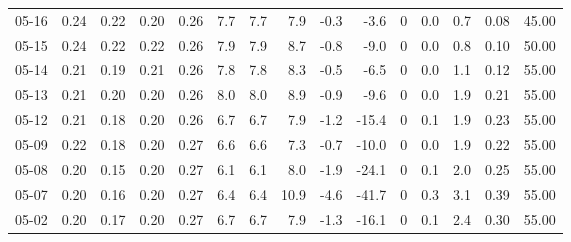 \begin{threeparttable}
{\begin{tabular}{lrrrrrrrrrrrrrr}
  05-16 &          0.24 &          0.22 &          0.20 &        0.26 &                 7.7 &                7.7 &                 7.9 &       -0.3 &         -3.6 &              0 &                 0.0 &              0.7 &            0.08 &                  45.00 \\
  05-15 &          0.24 &          0.22 &          0.22 &        0.26 &                 7.9 &                7.9 &                 8.7 &       -0.8 &         -9.0 &              0 &                 0.0 &              0.8 &            0.10 &                  50.00 \\
  05-14 &          0.21 &          0.19 &          0.21 &        0.26 &                 7.8 &                7.8 &                 8.3 &       -0.5 &         -6.5 &              0 &                 0.0 &              1.1 &            0.12 &                  55.00 \\
  05-13 &          0.21 &          0.20 &          0.20 &        0.26 &                 8.0 &                8.0 &                 8.9 &       -0.9 &         -9.6 &              0 &                 0.0 &              1.9 &            0.21 &                  55.00 \\
  05-12 &          0.21 &          0.18 &          0.20 &        0.26 &                 6.7 &                6.7 &                 7.9 &       -1.2 &        -15.4 &              0 &                 0.1 &              1.9 &            0.23 &                  55.00 \\
  05-09 &          0.22 &          0.18 &          0.20 &        0.27 &                 6.6 &                6.6 &                 7.3 &       -0.7 &        -10.0 &              0 &                 0.0 &              1.9 &            0.22 &                  55.00 \\
  05-08 &          0.20 &          0.15 &          0.20 &        0.27 &                 6.1 &                6.1 &                 8.0 &       -1.9 &        -24.1 &              0 &                 0.1 &              2.0 &            0.25 &                  55.00 \\
  05-07 &          0.20 &          0.16 &          0.20 &        0.27 &                 6.4 &                6.4 &                10.9 &       -4.6 &        -41.7 &              0 &                 0.3 &              3.1 &            0.39 &                  55.00 \\
  05-02 &          0.20 &          0.17 &          0.20 &        0.27 &                 6.7 &                6.7 &                 7.9 &       -1.3 &        -16.1 &              0 &                 0.1 &              2.4 &            0.30 &                  55.00 \\

\end{tabular}}
\end{threeparttable}
